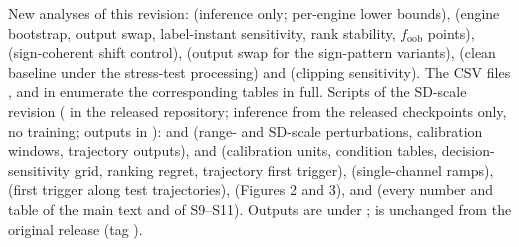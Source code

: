 \documentclass[10pt,a4paper]{article}
\newif\ifanon
\begin{document}
{\sloppy \noindent New analyses of this revision:  (inference only; per-engine lower bounds),  (engine bootstrap, output swap, label-instant sensitivity, rank stability, $f_{\mathrm{oob}}$ points),  (sign-coherent shift control),  (output swap for the sign-pattern variants),  (clean baseline under the stress-test processing) and  (clipping sensitivity). The CSV files ,  and  in  enumerate the corresponding tables in full. Scripts of the SD-scale revision ( in the released repository; inference from the released checkpoints only, no training; outputs in ):  and  (range- and SD-scale perturbations, calibration windows, trajectory outputs),  and  (calibration units, condition tables, decision-sensitivity grid, ranking regret, trajectory first trigger),  (single-channel ramps),  (first trigger along test trajectories),  (Figures 2 and 3),  and  (every number and table of the main text and of S9--S11). Outputs are under ;  is unchanged from the original release\ifanon\else{} (tag )\fi.}
\end{document}
